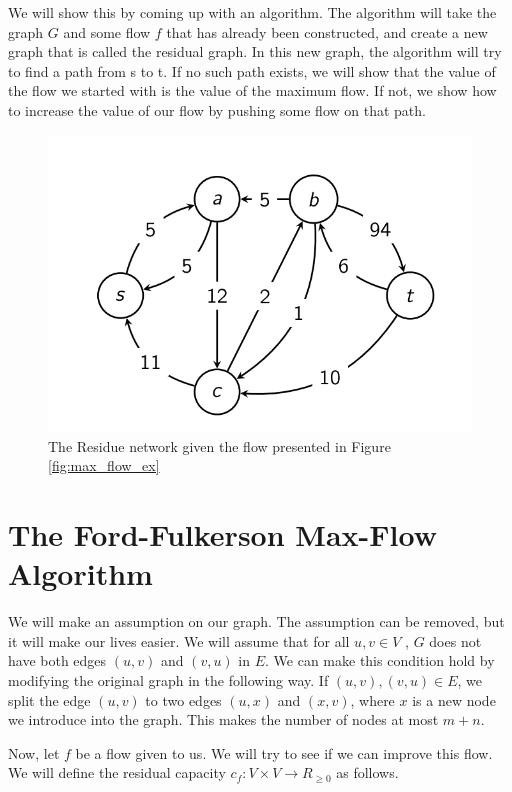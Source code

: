 \documentclass [12pt]{article}
\theoremstyle{definition}
\begin{document}
We will show this by coming up with an algorithm. The algorithm will take the graph $G$ and some flow $f$ that has already been constructed, and create a new graph that is called the residual graph. In this new graph, the algorithm will try to find a path from s to t. If no such path exists, we will show that the value of the flow we started with is the value of the maximum flow. If not, we show how to increase the value of our flow by pushing some flow
on that path.

\begin{figure}[h!]
\centering
\includegraphics[scale=0.6]{max_flow_res.png}
\caption{The Residue network given the flow presented in Figure \ref{fig:max_flow_ex}}
\label{fig:max_flow_res}
\end{figure}


\section{The Ford-Fulkerson Max-Flow Algorithm}

We will make an assumption on our graph. The assumption can be removed, but it will make our lives easier. We will assume that for all $u, v \in V$ , $G$ does not have both edges $(u, v )$ and $(v, u)$ in $E$. We can make this condition hold by modifying the original graph in the following way. If $(u, v ), (v, u) \in E$, we split the edge $(u, v )$ to two edges $(u, x)$ and $(x, v )$, where $x$ is a new node we introduce into the graph. This makes the number of nodes at most $m + n$. 

Now, let $f$ be a flow given to us. We will try to see if we can improve this flow. We will define the residual capacity $c_f : V \times V \to R_{\geq 0}$ as follows. 
\end{document}
